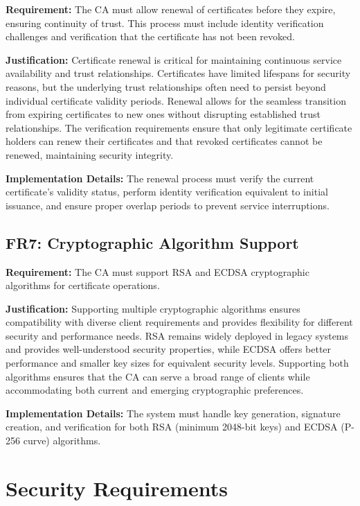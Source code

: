 \textbf{Requirement:} The CA must allow renewal of certificates before they expire, ensuring continuity of trust. This process must include identity verification challenges and verification that the certificate has not been revoked.

\textbf{Justification:} Certificate renewal is critical for maintaining continuous service availability and trust relationships. Certificates have limited lifespans for security reasons, but the underlying trust relationships often need to persist beyond individual certificate validity periods. Renewal allows for the seamless transition from expiring certificates to new ones without disrupting established trust relationships. The verification requirements ensure that only legitimate certificate holders can renew their certificates and that revoked certificates cannot be renewed, maintaining security integrity.

\textbf{Implementation Details:} The renewal process must verify the current certificate's validity status, perform identity verification equivalent to initial issuance, and ensure proper overlap periods to prevent service interruptions.

\subsection{FR7: Cryptographic Algorithm Support}

\textbf{Requirement:} The CA must support RSA and ECDSA cryptographic algorithms for certificate operations.

\textbf{Justification:} Supporting multiple cryptographic algorithms ensures compatibility with diverse client requirements and provides flexibility for different security and performance needs. RSA remains widely deployed in legacy systems and provides well-understood security properties, while ECDSA offers better performance and smaller key sizes for equivalent security levels. Supporting both algorithms ensures that the CA can serve a broad range of clients while accommodating both current and emerging cryptographic preferences.

\textbf{Implementation Details:} The system must handle key generation, signature creation, and verification for both RSA (minimum 2048-bit keys) and ECDSA (P-256 curve) algorithms.

\section{Security Requirements}

